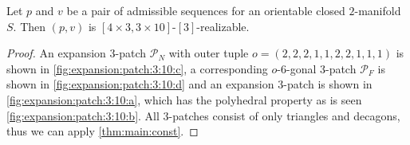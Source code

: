 \clearpage
\begin{theorem}
  Let $p$ and $v$ be a pair of admissible sequences for an orientable closed $2$-manifold $S$. Then $(p, v)$ is $[4 \times 3, 3 \times 10]$-$[3]$-realizable.
  \begin{proof}
    An expansion $3$-patch $\mathcal{P}_N$ with outer tuple $o = (2, 2, 2, 1, 1, 2, 2, 1, 1, 1)$ is shown in \autoref{fig:expansion:patch:3:10:c}, a corresponding $o$-$6$-gonal $3$-patch $\mathcal{P}_F$ is shown in \autoref{fig:expansion:patch:3:10:d} and an expansion $3$-patch is shown in \autoref{fig:expansion:patch:3:10:a}, which has the polyhedral property as is seen \autoref{fig:expansion:patch:3:10:b}. All $3$-patches consist of only triangles and decagons, thus we can apply \autoref{thm:main:const}.
  \end{proof}
\end{theorem}
{\par\vspace*{\fill}}
